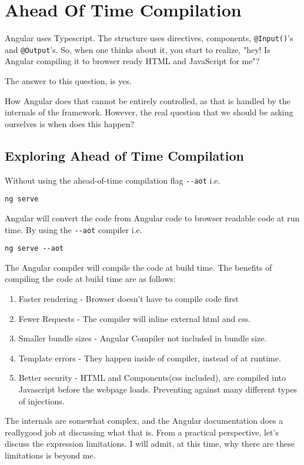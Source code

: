 \chapter{ Ahead Of Time Compilation }
Angular uses Typescript. The structure uses directives, components, \lstinline{@Input()}'s and \lstinline{@Output}'s. So, when one thinks about it, you start to realize, "hey! Is Angular compiling it to browser ready HTML and JavaScript for me"? 

The answer to this question, is yes. 

How Angular does that cannot be entirely controlled, as that is handled by the internals of the framework. However, the real question that we should be asking ourselves is when does this happen?

\section{Exploring Ahead of Time Compilation}
Without using the ahead-of-time compilation flag \lstinline{--aot} i.e. 
\begin{verbatim}
ng serve
\end{verbatim}

Angular will convert the code from Angular code to browser readable code at run time. By using the \lstinline{--aot} compiler i.e.
\begin{verbatim}
ng serve --aot
\end{verbatim}

The Angular compiler will compile the code at build time. The benefits of compiling the code at build time are as follows: 
\begin{enumerate}
\item Faster rendering - Browser doesn't have to compile code first
\item Fewer Requests - The compiler will inline external html and css.
\item Smaller bundle sizes - Angular Compiler not included in bundle size. 
\item Template errors - They happen inside of compiler, instead of at runtime.
\item Better security - HTML and Components(css included), are compiled into 
Javascript before the webpage loads. Preventing against many different types
of injections. 
\end{enumerate}

The internals are somewhat complex, and the Angular documentation does a reallygood job at discussing what that is. From a practical perspective, let's discuss the expression limitations. I will admit, at this time, why there are these limitations is beyond me. 

